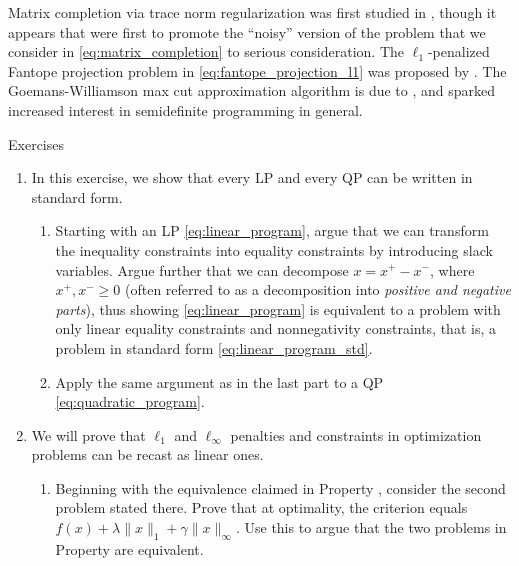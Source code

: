 Matrix completion via trace norm regularization was first studied in
\cite{candes2009exact, candes2010power}, though it appears that
\cite{mazumder2010spectral} were first to promote the ``noisy'' version of the
problem that we consider in \eqref{eq:matrix_completion} to serious
consideration. The $\ell_1$-penalized Fantope projection problem in
\eqref{eq:fantope_projection_l1} was proposed by \cite{vu2013fantope}. The
Goemans-Williamson max cut approximation algorithm is due to
\cite{goemans1995improved}, and sparked increased interest in semidefinite 
programming in general. 

\clearpage

\begin{xcb}{Exercises}
\begin{enumerate}[label=\thechapter.\arabic*]
\settowidth{\leftmargini}{0.00.\hskip\labelsep}
\item \label{ex:linear_quadratic_std} 
  In this exercise, we show that every LP and every QP can be written in
  standard form.  

\begin{enumerate}[label=\alph*.]
\item Starting with an LP \eqref{eq:linear_program}, argue that we can transform  
  the inequality constraints into equality constraints by introducing slack
  variables. Argue further that we can decompose $x = x^+ - x^-$, where $x^+, 
  x^- \geq 0$ (often referred to as a decomposition into \emph{positive and
    negative parts}), thus showing \eqref{eq:linear_program} is equivalent to a
  problem with only linear equality constraints and nonnegativity constraints, 
  that is, a problem in standard form \eqref{eq:linear_program_std}.    

\item Apply the same argument as in the last part to a QP
  \eqref{eq:quadratic_program}.
\end{enumerate}

\item \label{ex:l1_linf_linear} 
  We will prove that $\ell_1$ and $\ell_\infty$ penalties and constraints in
  optimization problems can be recast as linear ones.  

\begin{enumerate}[label=\alph*.]
\item Beginning with the equivalence claimed in Property
  , consider the second problem stated there. Prove
  that at optimality, the criterion equals $f(x) + \lambda \|x\|_1 + \gamma
  \|x\|_\infty$. Use this to argue that the two problems in Property
   are equivalent.  


\end{enumerate}
\end{enumerate}
\end{xcb}
